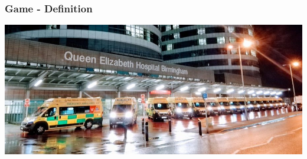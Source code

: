 \begin{frame}
    \frametitle{Game - Definition}

    \includegraphics[scale=0.45]{Bin/ambulance_pics/ambulance_queue.jpg}

\end{frame}

